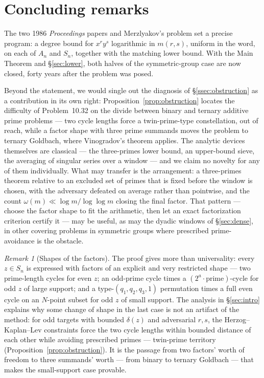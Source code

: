 \documentclass[11pt]{amsart}
\numberwithin{equation}{section}
\theoremstyle{remark}
\newtheorem{remark}[theorem]{Remark}
\begin{document}
\section{Concluding remarks}\label{sec:remarks}

The two 1986 \emph{Proceedings} papers and Merzlyakov's problem set a precise
program: a degree bound for $x^ry^s$ logarithmic in $m(r,s)$, uniform in the
word, on each of $A_n$ and $S_n$, together with the matching lower bound. With
the Main Theorem and \S\ref{sec:lower}, both halves of the symmetric-group case
are now closed, forty years after the problem was posed.

Beyond the statement, we would single out the diagnosis of
\S\ref{ssec:obstruction} as a contribution in its own right:
Proposition~\ref{prop:obstruction} locates the difficulty of Problem~10.32 on
the divide between binary and ternary additive prime problems --- two cycle
lengths force a twin-prime-type constellation, out of reach, while a factor
shape with three prime summands moves the problem to ternary Goldbach, where
Vinogradov's theorem applies. The analytic devices themselves are classical ---
the three-primes lower bound, an upper-bound sieve, the averaging of singular
series over a window --- and we claim no novelty for any of them individually.
What may transfer is the arrangement: a three-primes theorem relative to an
excluded set of primes that is fixed before the window is chosen, with the
adversary defeated on average rather than pointwise, and the count
$\omega(m)\ll\log m/\log\log m$ closing the final factor. That pattern ---
choose the factor shape to fit the arithmetic, then let an exact factorization
criterion certify it --- may be useful, as may the dyadic windows of
\S\ref{sec:dense}, in other covering problems in symmetric groups where
prescribed prime-avoidance is the obstacle.


\begin{remark}[Shapes of the factors]
The proof gives more than universality: every $z\in S_n$ is expressed with factors
of an explicit and very restricted shape --- two prime-length cycles for even $z$;
an odd-prime cycle times a $(2^a\cdot\text{prime})$-cycle for odd $z$ of large
support; and a type-$(q_1,q_2,q_3,1)$ permutation times a full even cycle on an
$N$-point subset for odd $z$ of small support. The analysis in
\S\ref{sec:intro} explains why some change of shape in the last case is not an
artifact of the method: for odd targets with bounded $\delta(z)$ and adversarial
$r,s$, the Herzog--Kaplan--Lev constraints force the two cycle lengths within
bounded distance of each other while avoiding prescribed primes --- twin-prime
territory (Proposition~\ref{prop:obstruction}). It is the passage from two
factors' worth of freedom to
three summands' worth --- from binary to ternary Goldbach --- that makes the
small-support case provable.
\end{remark}
\end{document}
